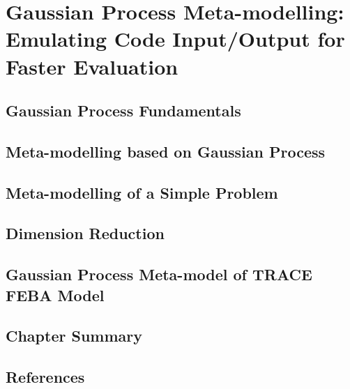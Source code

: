\chapter{Gaussian Process Meta-modelling: Emulating Code Input/Output for Faster Evaluation}
\label{ch:gaussian_process}

\section{Gaussian Process Fundamentals}

\section{Meta-modelling based on Gaussian Process}

\section{Meta-modelling of a Simple Problem}

\section{Dimension Reduction}

\section{Gaussian Process Meta-model of TRACE FEBA Model}

\section{Chapter Summary}

\section{References}